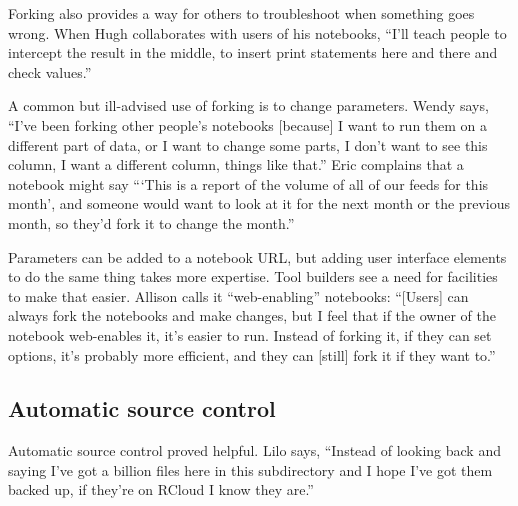 Forking also provides a way for others to troubleshoot when something goes
wrong. When Hugh collaborates with users of his notebooks, ``I'll teach people
to intercept the result in the middle, to insert print statements here and
there and check values.''



A common but ill-advised use of forking is to change
parameters. Wendy says, ``I've been forking other people's notebooks [because] I
want to run them on a different part of data, or I want to change some parts,
I don't want to see this column, I want a different column, things like
that.'' Eric complains that a notebook might say ```This is a report of
the volume of all of our feeds for this month', and someone would want to
look at it for the next month or the previous month, so they'd fork it to
change the month.''

Parameters can be added to a notebook URL, but adding user interface
elements to do the same thing takes more expertise. Tool builders see a
need for facilities to make that easier. Allison calls it ``web-enabling''
notebooks: ``[Users] can always fork the notebooks and make changes, but I
feel that if the owner of the notebook web-enables it, it's easier to
run. Instead of forking it, if they can set options, it's probably more
efficient, and they can [still] fork it if they want to.''


\subsection{Automatic source control}

Automatic source control proved helpful. Lilo says, ``Instead of
looking back and saying I've got a billion files here in this subdirectory and I
hope I've got them backed up, if they're on RCloud I know they are.''

